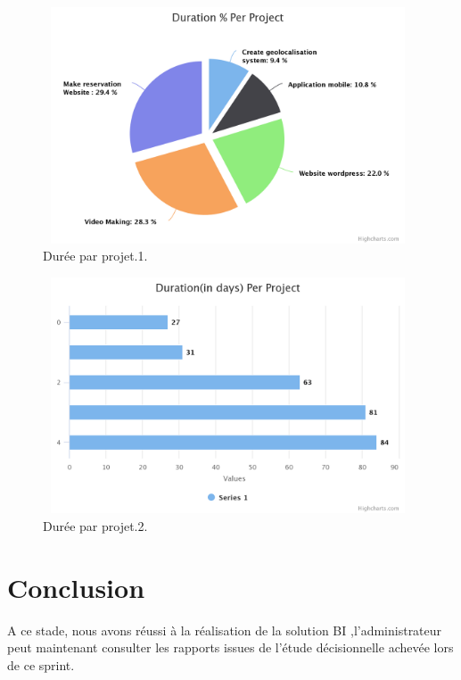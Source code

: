 \begin{figure}[H]
\center
\includegraphics[width=11cm,height=7cm]{./figures/pres/duration-per-project.png}
\caption{Dur\'{e}e par projet.1. }
\end{figure}



\begin{figure}[H]
\center
\includegraphics[width=11cm,height=7cm]{./figures/pres/durationin-days-per-proj.png}
\caption{Dur\'{e}e par projet.2.}
\end{figure}



\section{Conclusion}

A ce stade, nous avons réussi  à la réalisation de la solution BI ,l'administrateur peut maintenant
consulter les rapports issues de l'étude décisionnelle achevée lors de ce sprint. 